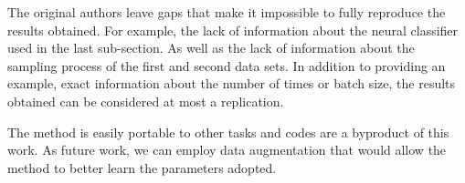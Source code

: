 The original authors leave gaps that make it impossible to fully reproduce the results obtained. For example, the lack of information about the neural classifier used in the last sub-section. As well as the lack of information about the sampling process of the first and second data sets. In addition to providing an example, exact information about the number of times or batch size, the results obtained can be considered at most a replication.


The method is easily portable to other tasks and codes are a byproduct of this work. As future work, we can employ data augmentation that would allow the method to better learn the parameters adopted.

